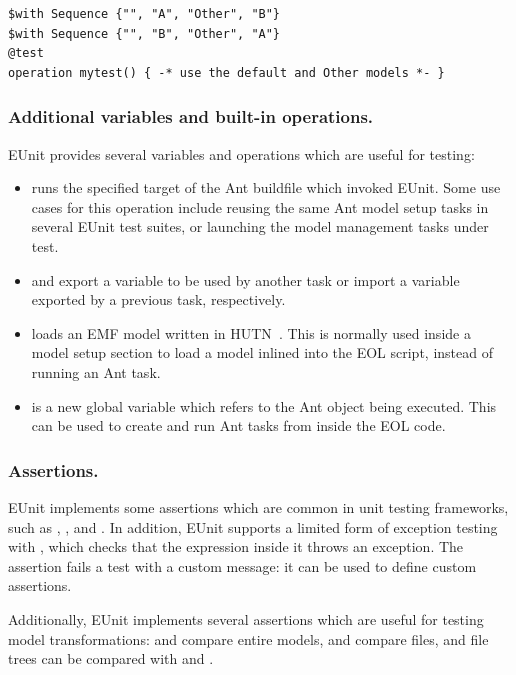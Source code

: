 \begin{lstlisting}[language=EOL,caption=Example of a model binding,label=lst:eunit-modelbind,columns=fixed,float]
$with Sequence {"", "A", "Other", "B"}
$with Sequence {"", "B", "Other", "A"}
@test
operation mytest() { -* use the default and Other models *- }
\end{lstlisting}

\subsubsection{Additional variables and built-in operations.} EUnit provides several variables and operations which are useful for testing:
\begin{itemize}
\item {} runs the specified target of the Ant buildfile which invoked EUnit. Some use cases for this operation include reusing the same Ant model setup tasks in several EUnit test suites, or launching the model management tasks under test.
\item {} and  export a variable to be used by another task or import a variable exported by a previous task, respectively.
\item {} loads an EMF model written in HUTN~\cite{HUTN}. This is normally used inside a model setup section to load a model inlined into the EOL script, instead of running an Ant task.
\item {} is a new global variable which refers to the Ant  object being executed. This can be used to create and run Ant tasks from inside the EOL code.
\end{itemize}

\subsubsection{Assertions.} EUnit implements some assertions which are common in unit testing frameworks, such as , ,  and . In addition, EUnit supports a limited form of exception testing with , which checks that the expression inside it throws an exception. The  assertion fails a test with a custom message: it can be used to define custom assertions.

Additionally, EUnit implements several assertions which are useful for testing model transformations:  and  compare entire models,  and  compare files, and file trees can be compared with  and .

